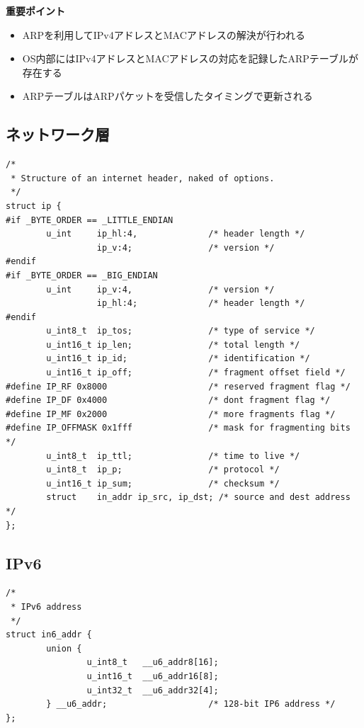 \begin{itembox}[l]{\bf 重要ポイント}
    \begin{itemize}
        \item ARPを利用してIPv4アドレスとMACアドレスの解決が行われる
        \item OS内部にはIPv4アドレスとMACアドレスの対応を記録したARPテーブルが存在する
        \item ARPテーブルはARPパケットを受信したタイミングで更新される
    \end{itemize}
\end{itembox}

\subsection{ネットワーク層} \label{sec:network}

\begin{lstlisting}[caption=IPv4ヘッダ定義 (/usr/include/netinet/ip.h),label=src:ip.h]
/*
 * Structure of an internet header, naked of options.
 */
struct ip {
#if _BYTE_ORDER == _LITTLE_ENDIAN
        u_int     ip_hl:4,              /* header length */
                  ip_v:4;               /* version */
#endif
#if _BYTE_ORDER == _BIG_ENDIAN
        u_int     ip_v:4,               /* version */
                  ip_hl:4;              /* header length */
#endif
        u_int8_t  ip_tos;               /* type of service */
        u_int16_t ip_len;               /* total length */
        u_int16_t ip_id;                /* identification */
        u_int16_t ip_off;               /* fragment offset field */
#define IP_RF 0x8000                    /* reserved fragment flag */
#define IP_DF 0x4000                    /* dont fragment flag */
#define IP_MF 0x2000                    /* more fragments flag */
#define IP_OFFMASK 0x1fff               /* mask for fragmenting bits */
        u_int8_t  ip_ttl;               /* time to live */
        u_int8_t  ip_p;                 /* protocol */
        u_int16_t ip_sum;               /* checksum */
        struct    in_addr ip_src, ip_dst; /* source and dest address */
};
\end{lstlisting}

\subsection{IPv6} \label{sec:ipv6}

\begin{lstlisting}[caption=IPv6アドレス構造体 (/usr/include/netinet6/in6.h),label=src:in6.h]
/*
 * IPv6 address
 */
struct in6_addr {
        union {
                u_int8_t   __u6_addr8[16];
                u_int16_t  __u6_addr16[8];
                u_int32_t  __u6_addr32[4];
        } __u6_addr;                    /* 128-bit IP6 address */
};
\end{lstlisting}

